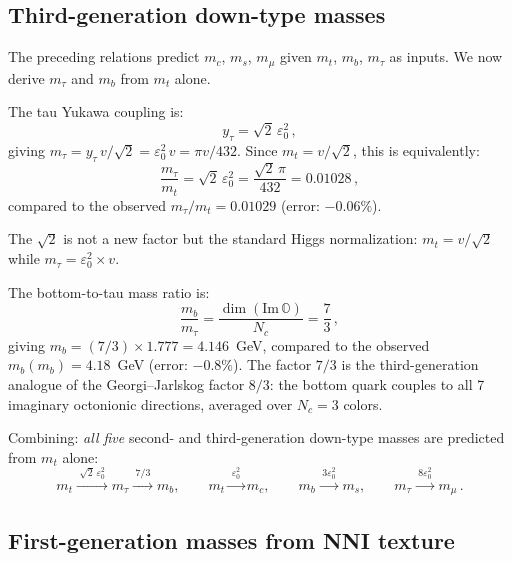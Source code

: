 \documentclass[12pt,a4paper]{article}
\theoremstyle{definition}
\theoremstyle{remark}
\newcommand{\Oct}{\mathbb{O}}
\begin{document}
\subsection{Third-generation down-type masses}

The preceding relations predict $m_c$, $m_s$, $m_\mu$ given $m_t$, $m_b$, 
$m_\tau$ as inputs. We now derive $m_\tau$ and $m_b$ from $m_t$ alone.

The tau Yukawa coupling is:
\begin{equation}
y_\tau = \sqrt{2}\,\varepsilon_0^2\,,
\end{equation}
giving $m_\tau = y_\tau\, v/\sqrt{2} = \varepsilon_0^2\, v = \pi v / 432$. 
Since $m_t = v/\sqrt{2}$, this is equivalently:
\begin{equation}
\frac{m_\tau}{m_t} = \sqrt{2}\,\varepsilon_0^2 = \frac{\sqrt{2}\,\pi}{432}
= 0.01028\,,
\label{eq:mtau}
\end{equation}
compared to the observed $m_\tau/m_t = 0.01029$ (error: $-0.06\%$).

The $\sqrt{2}$ is not a new factor but the standard Higgs normalization: 
$m_t = v/\sqrt{2}$ while $m_\tau = \varepsilon_0^2 \times v$.

The bottom-to-tau mass ratio is:
\begin{equation}
\frac{m_b}{m_\tau} = \frac{\dim(\mathrm{Im}\,\Oct)}{N_c} = \frac{7}{3}\,,
\label{eq:mb_mtau}
\end{equation}
giving $m_b = (7/3) \times 1.777 = 4.146$~GeV, compared to the observed 
$m_b(m_b) = 4.18$~GeV (error: $-0.8\%$). The factor $7/3$ is the 
third-generation analogue of the Georgi--Jarlskog factor $8/3$: the bottom 
quark couples to all 7 imaginary octonionic directions, averaged over 
$N_c = 3$ colors.

Combining: \emph{all five} second- and third-generation down-type masses 
are predicted from $m_t$ alone:
\begin{equation}
m_t \xrightarrow{\;\sqrt{2}\,\varepsilon_0^2\;} m_\tau 
\xrightarrow{\;7/3\;} m_b, \qquad
m_t \xrightarrow{\;\varepsilon_0^2\;} m_c, \qquad
m_b \xrightarrow{\;3\varepsilon_0^2\;} m_s, \qquad
m_\tau \xrightarrow{\;8\varepsilon_0^2\;} m_\mu\,.
\end{equation}

\subsection{First-generation masses from NNI texture}
\label{sec:first_gen}
\end{document}
